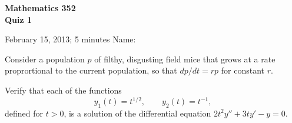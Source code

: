 \documentclass[11pt]{exam}
\begin{document}
\noindent
\textbf{{\large Mathematics 352 \\ Quiz 1}}

\noindent
February 15, 2013; 5 minutes  \hfill Name: \underline{\hspace{3in}} 

\begin{questions}  

\question Consider a population $p$ of filthy, disgusting field mice that grows at a rate proprortional to the current population, so that $dp/dt = rp$ for constant $r$.

\question Verify that each of the functions 
\[
    y_1(t) = t^{1/2}, \qquad y_2(t) = t^{-1},
\]
defined for $t > 0$, is a solution of the differential equation $2t^2 y'' + 3ty' - y = 0$.



\end{questions}
\end{document}
